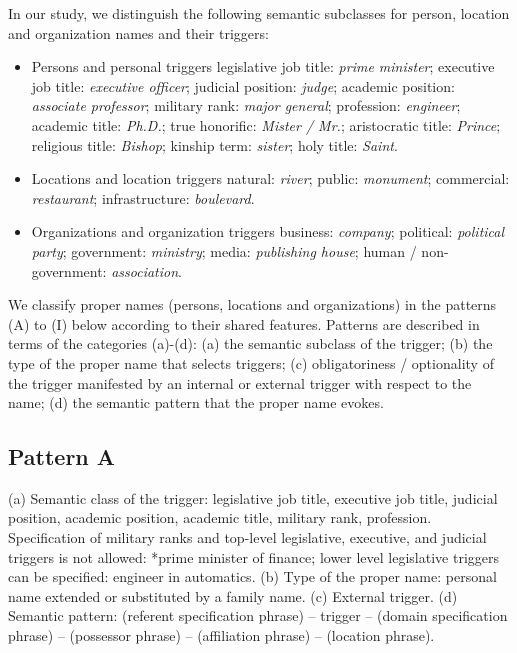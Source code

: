 \documentclass[output=paper]{langsci/langscibook}
\begin{document}
In our study, we distinguish the following semantic subclasses for
person, location and organization names and their triggers:

\begin{itemize}
\item Persons and personal triggers \textendash legislative job title: \textit{prime
minister}; executive job title: \textit{executive officer}; judicial
position: \textit{judge}; academic position: \textit{associate
professor}; military rank: \textit{major general}; profession:
\textit{engineer}; academic title: \textit{Ph.D.}; true honorific:
\textit{Mister / Mr.}; aristocratic title: \textit{Prince}; religious
title: \textit{Bishop}; kinship term: \textit{sister}; holy title:
\textit{Saint}.
\item Locations and location triggers \textendash natural: \textit{river}; public:
\textit{monument}; commercial: \textit{restaurant}; infrastructure:
\textit{boulevard}.
\item Organizations and organization triggers \textendash business: \textit{company};
political: \textit{political party}; government: \textit{ministry};
media: \textit{publishing house}; human / non-government:
\textit{association}.
\end{itemize}

We classify proper names (persons, locations and organizations) in the
patterns (A) to (I) below according to their shared features.
Patterns are described in terms of the categories (a)-(d): (a) the
semantic subclass of the trigger; (b) the type of the proper name that
selects triggers; (c) obligatoriness / optionality of the trigger
manifested by an internal or external trigger with respect to the name;
(d) the semantic pattern that the proper name evokes.



\subsection{Pattern A}

(a) Semantic class of the trigger: legislative job title, executive job
title, judicial position, academic position, academic title, military
rank, profession. Specification of military ranks and top-level
legislative, executive, and judicial triggers is not allowed: *prime
minister of finance; lower level legislative triggers can be specified:
engineer in automatics. (b) Type of the proper name: personal name
extended or substituted by a family name. (c) External trigger. (d)
Semantic pattern: (referent specification phrase) – trigger – (domain
specification phrase) – (possessor phrase) – (affiliation phrase) –
(location phrase).
\end{document}
